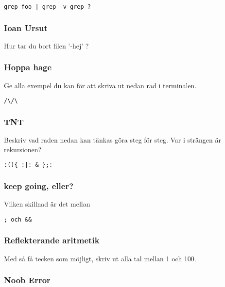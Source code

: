 \begin{verbatim}
grep foo | grep -v grep ?
\end{verbatim}

\subsubsection{Ioan Ursut}\label{ioan-ursut}

Hur tar du bort filen '-hej' ?

\subsubsection{Hoppa hage}\label{hoppa-hage}

Ge alla exempel du kan för att skriva ut nedan rad i terminalen.

\begin{verbatim}
/\/\
\end{verbatim}

\subsubsection{TNT}\label{tnt}

Beskriv vad raden nedan kan tänkas göra steg för steg. Var i strängen är
rekursionen?

\begin{verbatim}
:(){ :|: & };:
\end{verbatim}

\subsubsection{keep going, eller?}\label{keep-going-eller}

Vilken skillnad är det mellan

\begin{verbatim}
; och &&
\end{verbatim}

\subsubsection{Reflekterande aritmetik}\label{reflekterande-aritmetik}

Med så få tecken som möjligt, skriv ut alla tal mellan 1 och 100.

\subsubsection{Noob Error}\label{noob-error}

